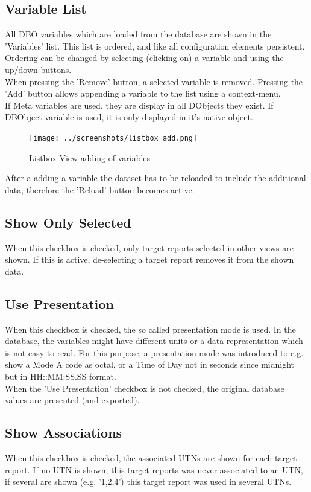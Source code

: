 \subsection{Variable List}
All DBO variables which are loaded from the database are shown in the 'Variables' list. This list is ordered, and like all configuration elements persistent. Ordering can be changed by selecting (clicking on) a variable and using the up/down buttons. \\

When pressing the 'Remove' button, a selected variable is removed.  Pressing the 'Add' button allows appending a variable to the list using a context-menu. \\

If Meta variables are used, they are display in all DObjects they exist. If DBObject variable is used, it is only displayed in it's native object.

\begin{figure}[H]
    \texttt{[image: ../screenshots/listbox\_add.png]}
  \caption{Listbox View adding of variables}
\end{figure}

After a adding a variable the dataset has to be reloaded to include the additional data, therefore the 'Reload' button becomes active.


\subsection{Show Only Selected}
When this checkbox is checked, only target reports selected in other views are shown. If this is active, de-selecting a target report removes it from the shown data.

\subsection{Use Presentation}
When this checkbox is checked, the so called presentation mode is used. In the database, the variables might have different units or a data representation which is not easy to read. For this purpose, a presentation mode was introduced to e.g. show a Mode A code as octal, or a Time of Day not in seconds since midnight but in HH::MM:SS.SS format. \\

When the 'Use Presentation' checkbox is not checked, the original database values are presented (and exported).

\subsection{Show Associations}
When this checkbox is checked, the associated UTNs are shown for each target report. If no UTN is shown, this target reports was never associated to an UTN, if several are shown (e.g. '1,2,4') this target report was used in several UTNs. \\

